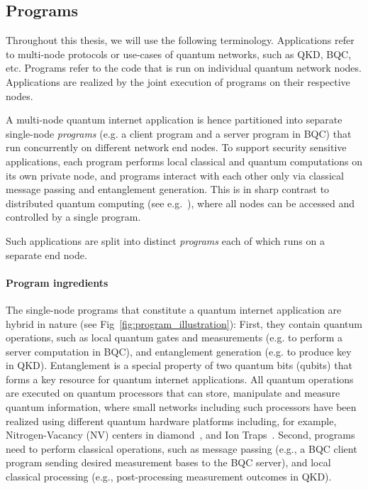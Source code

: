 \subsection{Programs}
Throughout this thesis, we will use the following terminology.
Applications refer to multi-node protocols or use-cases of quantum networks, such as QKD, BQC, etc.
Programs refer to the code that is run on individual quantum network nodes.
Applications are realized by the joint execution of programs on their respective nodes.

A multi-node quantum internet application is hence partitioned into separate single-node \textit{programs} (e.g. a client program and a server program in BQC) that run concurrently on different network end nodes.
To support security sensitive applications, each program performs local classical and quantum computations on its own private node, and programs interact with each other only via classical message passing and entanglement generation.
This is in sharp contrast to distributed quantum computing (see e.g.~\cite{cacciapuoti2019quantum}), where all nodes can be accessed and controlled by a single program. 


Such applications are split into distinct \textit{programs} each of which runs on a separate end node.


\paragraph{Program ingredients}

The single-node programs that constitute a quantum internet application are hybrid in nature (see Fig~\ref{fig:program_illustration}):
First, they contain quantum operations, such as local quantum gates and measurements (e.g. to perform a server computation in BQC), and entanglement generation (e.g. to produce key in QKD). Entanglement is a special property of two quantum bits (qubits) that forms a key resource for quantum internet applications. 
All quantum operations are executed on quantum processors that can store, manipulate and measure quantum information, where small networks including such processors have been realized using different quantum hardware platforms including, for example,  Nitrogen-Vacancy (NV) centers in diamond~\cite{pompili2021realization}, and Ion Traps~\cite{krutyanskiy2023entanglement}.
Second, programs need to perform classical operations, such as message passing (e.g., a BQC client program sending desired measurement bases to the BQC server), and local classical processing (e.g., post-processing measurement outcomes in QKD).


